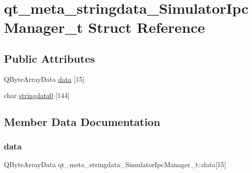 \hypertarget{structqt__meta__stringdata___simulator_ipc_manager__t}{}\section{qt\+\_\+meta\+\_\+stringdata\+\_\+\+Simulator\+Ipc\+Manager\+\_\+t Struct Reference}
\label{structqt__meta__stringdata___simulator_ipc_manager__t}
\subsection*{Public Attributes}
\begin{DoxyCompactItemize}
\item 
Q\+Byte\+Array\+Data \mbox{\hyperlink{structqt__meta__stringdata___simulator_ipc_manager__t_a2d91e8b50603b5bba28491f92989513b}{data}} \mbox{[}15\mbox{]}
\item 
char \mbox{\hyperlink{structqt__meta__stringdata___simulator_ipc_manager__t_a25a5908648e17144b16d0972b2184cf8}{stringdata0}} \mbox{[}144\mbox{]}
\end{DoxyCompactItemize}


\subsection{Member Data Documentation}
\mbox{\label{structqt__meta__stringdata___simulator_ipc_manager__t_a2d91e8b50603b5bba28491f92989513b}} 
\subsubsection{\texorpdfstring{data}{data}}
{\footnotesize\ttfamily Q\+Byte\+Array\+Data qt\+\_\+meta\+\_\+stringdata\+\_\+\+Simulator\+Ipc\+Manager\+\_\+t\+::data\mbox{[}15\mbox{]}}

\mbox{\label{structqt__meta__stringdata___simulator_ipc_manager__t_a25a5908648e17144b16d0972b2184cf8}} 
